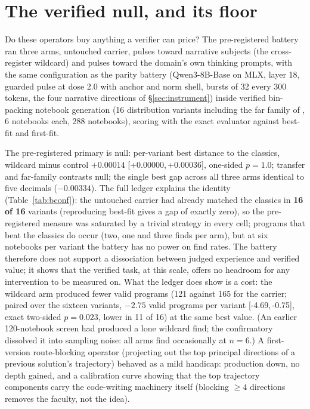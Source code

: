 \documentclass[11pt]{article}
\newcommand{\ci}[2]{[#1,\,#2]}
\begin{document}
\section{The verified null, and its floor}
\label{sec:verified}

Do these operators buy anything a verifier can price? The
pre-registered battery ran three arms, untouched carrier, pulses
toward narrative subjects (the cross-register wildcard) and pulses
toward the domain's own thinking prompts, with the same configuration as
the parity battery (Qwen3-8B-Base on MLX, layer 18, guarded pulse at
dose 2.0 with anchor and norm shell, bursts of 32 every 300 tokens, the
four narrative directions of \S\ref{sec:instrument}) inside verified
bin-packing notebook generation (16 distribution variants including the far family
of \citet{ono2026mass}, 6 notebooks each, 288 notebooks), scoring with
the exact evaluator against best-fit and first-fit.

The pre-registered primary is null: per-variant best distance to the
classics, wildcard minus control $+0.00014$ \ci{+0.00000}{+0.00036},
one-sided $p=1.0$; transfer and far-family contrasts null; the single
best gap across all three arms identical to five decimals ($-0.00334$).
The full ledger explains the identity (Table~\ref{tab:bconf}): the
untouched carrier had already matched the classics in \textbf{16 of 16}
variants (reproducing best-fit gives a gap of exactly zero), so the
pre-registered measure was saturated by a trivial strategy in every
cell; programs that beat the classics do occur (two, one and three
finds per arm), but at six notebooks per variant the battery has no
power on find rates. The battery therefore does not support a
dissociation between judged experience and verified value; it shows
that the verified task, at this scale, offers no headroom for any
intervention to be measured on. What the ledger does show is a cost:
the wildcard arm produced fewer valid programs (121 against 165 for the
carrier; paired over the sixteen variants, $-2.75$ valid programs per
variant \ci{-4.69}{-0.75}, exact two-sided $p=0.023$, lower in 11 of
16) at the same best value. (An earlier 120-notebook
screen had produced a lone wildcard find; the confirmatory dissolved it
into sampling noise: all arms find occasionally at $n{=}6$.) A
first-version route-blocking operator (projecting out the top
principal directions of a previous solution's trajectory) behaved as
a mild handicap: production down, no depth gained, and a calibration
curve showing that the top trajectory components carry the
code-writing machinery itself (blocking $\ge 4$ directions removes the
faculty, not the idea).
\end{document}
